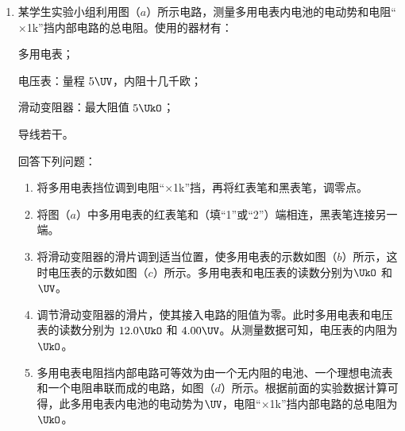 \documentclass[\gkver]{gaokaozhenti}
\begin{document}
\begin{enumerate}
{\begin{enumerate}
	\item
	系统误差。
\end{enumerate}
}

\item
某学生实验小组利用图（$a$）所示电路，测量多用电表内电池的电动势和电阻“$\times$1k”挡内部电路的总电阻。使用的器材有：

多用电表；

电压表：量程 $5\UV$，内阻十几千欧；

滑动变阻器：最大阻值 $5\UkO$；

导线若干。

回答下列问题：
\begin{enumerate}
	\item
	将多用电表挡位调到电阻“$\times$1k”挡，再将红表笔和黑表笔，调零点。
	\item
	将图（$a$）中多用电表的红表笔和（填“1”或“2”）端相连，黑表笔连接另一端。
	\item
	将滑动变阻器的滑片调到适当位置，使多用电表的示数如图（$b$）所示，这时电压表的示数如图（$c$）所示。多用电表和电压表的读数分别为$\UkO$ 和$\UV$。
	\item
	调节滑动变阻器的滑片，使其接入电路的阻值为零。此时多用电表和电压表的读数分别为 $12.0\UkO$ 和 $4.00\UV$。从测量数据可知，电压表的内阻为$\UkO$。
	\item
	多用电表电阻挡内部电路可等效为由一个无内阻的电池、一个理想电流表和一个电阻串联而成的电路，如图（$d$）所示。根据前面的实验数据计算可得，此多用电表内电池的电动势为$\UV$，电阻“$\times$1k”挡内部电路的总电阻为$\UkO$。
\end{enumerate}


\end{enumerate}
\end{document}
